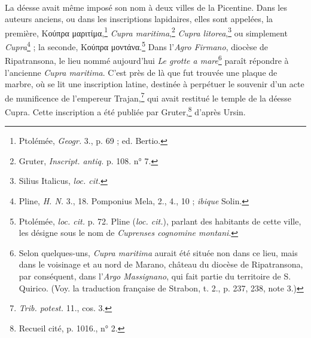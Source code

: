 \documentclass{article}
\begin{document}
\paragraph{}
La déesse avait même imposé son nom à deux villes de la Picentine. Dans les auteurs anciens, ou dans les inscriptions lapidaires, elles sont appelées, la première, \textgreek{Κούπρα μαριτίμα},\footnote{Ptolémée, \emph{Geogr.} 3., p. 69 ; ed. Bertio.} \emph{Cupra maritima},\footnote{Gruter, \emph{Inscript. antiq.} p. 108. n° 7.} \emph{Cupra litorea},\footnote{Silius Italicus, \emph{loc. cit.}} ou simplement \emph{Cupra}\footnote{Pline, \emph{H. N.} 3., 18. Pomponius Mela, 2., 4., 10 ; \emph{ibique} Solin.} ; la seconde, \textgreek{Κούπρα μοντάνα}.\footnote{Ptolémée, \emph{loc. cit.} p. 72. Pline (\emph{loc. cit.}), parlant des habitants de cette ville, les désigne sous le nom de \emph{Cuprenses cognomine montani}.} Dans l'\emph{Agro Firmano}, diocèse de Ripatransona, le lieu nommé aujourd'hui \emph{Le grotte a mare}\footnote{Selon quelques-uns, \emph{Cupra maritima} aurait été située non dans ce lieu, mais dans le voisinage et au nord de Marano, château du diocèse de Ripatransona, par conséquent, dans l'\emph{Argo Massignano}, qui fait partie du territoire de S. Quirico. (Voy. la traduction française de Strabon, t. 2., p. 237, 238, note 3.)} paraît répondre à l'ancienne \emph{Cupra maritima}. C'est près de là que fut trouvée une plaque de marbre, où se lit une inscription latine, destinée à perpétuer le souvenir d'un acte de munificence de l'empereur Trajan,\footnote{\emph{Trib. potest.} 11., cos. 3.} qui avait restitué le temple de la déesse Cupra. Cette inscription a été publiée par Gruter,\footnote{Recueil cité, p. 1016., n° 2.} d'après Ursin.
\end{document}
